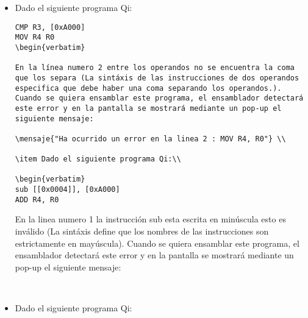 \begin{itemize}
\begin{verbatim}
1.ADD R0, [0x0002]
2.MOV R4, R0
\end{verbatim}

En la linea numero 1 el operando origen es directo lo cual es invalido en la arquitectura Q1 (El modo de direccionamiento Directo se incorpora en las arquitecturas Qi desde la arquitectura Q2 en adelante). Cuando el alumno quiera ensamblar este programa, el ensamblador detectará este error y en la pantalla se mostrará mediante un pop-up el siguiente mensaje:

 \\ 

\item Dado el siguiente programa Qi:\\

\begin{verbatim}
CMP R3, [0xA000]
MOV R4 R0 
\begin{verbatim}

En la línea numero 2 entre los operandos no se encuentra la coma que los separa (La sintáxis de las instrucciones de dos operandos especifica que debe haber una coma separando los operandos.). Cuando se quiera ensamblar este programa, el ensamblador detectará este error y en la pantalla se mostrará mediante un pop-up el siguiente mensaje:

\mensaje{"Ha ocurrido un error en la linea 2 : MOV R4, R0"} \\ 

\item Dado el siguiente programa Qi:\\

\begin{verbatim}
sub [[0x0004]], [0xA000]
ADD R4, R0
\end{verbatim}

En la linea numero 1 la instrucción sub esta escrita en minúscula esto es inválido (La sintáxis define que los nombres de las instrucciones son estrictamente en mayúscula). Cuando se quiera ensamblar este programa, el ensamblador detectará este error y en la pantalla se mostrará mediante un pop-up el siguiente mensaje:

 \\ 

\item Dado el siguiente programa Qi:\\


\end{itemize}
